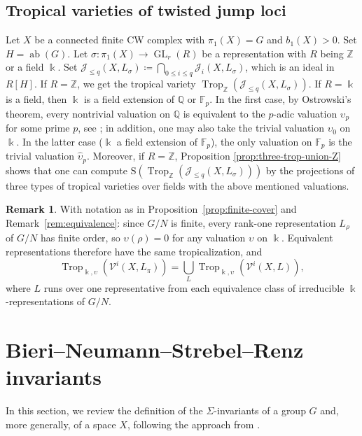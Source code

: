 \documentclass[11pt]{amsart}
\theoremstyle{definition}
\newtheorem{remark}[theorem]{Remark}
\newcommand{\Z}{\mathbb{Z}}
\newcommand{\Q}{\mathbb{Q}}
\newcommand{\F}{\mathbb{F}}
\renewcommand{\k}{\Bbbk}
\newcommand{\VV}{\mathcal{V}}
\newcommand{\cJ}{\mathcal{J}}
\newcommand{\rS}{\mathrm{S}}
\DeclareMathOperator{\ab}{{ab}}
\DeclareMathOperator{\GL}{GL}
\DeclareMathOperator{\Trop}{Trop}
\begin{document}
\subsection{Tropical varieties of twisted jump loci}
\label{subsec:twist-jump-trop}
Let $X$ be a connected finite CW complex with $\pi_1(X)=G$ and $b_1(X)>0$.
Set $H=\ab(G)$. Let $\sigma\colon \pi_1(X)\to \GL_r(R)$ be a representation 
with $R$ being $\Z$ or a field $\k$.
Set $\cJ_{\leq q}(X,L_\sigma)\coloneqq \bigcap_{0\leq i \leq q} \cJ_{ i}(X,L_\sigma)$, 
which is an ideal in $R[H]$. If $R=\Z$, we get the 
tropical variety $\Trop_\Z( \cJ_{\leq q}(X,L_\sigma) )$.
If $R=\k$ is a field, then $\k$ is a field extension of $\Q$ or $\F_p$.
In the first case, by Ostrowski's theorem, every nontrivial valuation 
on $\Q$ is equivalent to the $p$-adic valuation $\upsilon_p$ for some 
prime $p$, see \cite[Thm.~3.1.4]{Go}; in addition, one may also take 
the trivial valuation $\upsilon_0$ on $\k$.
In the latter case ($\k$ a field extension of $\F_p$), 
the only valuation on $\F_p$ is the trivial valuation $\hat{\upsilon}_p$.
Moreover, if $R=\Z$, Proposition \ref{prop:three-trop-union-Z} shows 
that one can compute $\rS(\Trop_\Z( \cJ_{\leq q}(X,L_\sigma) ))$ by the 
projections of three types of tropical varieties over fields with the above 
mentioned valuations.

\begin{remark}
\label{rem:tropical-twisted-cvs}
With notation as in Proposition~\ref{prop:finite-cover} and 
Remark~\ref{rem:equivalence}: since $G/N$ is finite, every 
rank-one representation $L_\rho$ of $G/N$ has finite order, so 
$\upsilon(\rho)=0$ for any valuation $\upsilon$ on $\k$. 
Equivalent representations therefore have the same tropicalization, 
and
\[
\Trop_{\k,\upsilon}(\VV^i(X,L_\pi))=\bigcup_L \Trop_{\k,\upsilon}(\VV^i(X,L)),
\]
where $L$ runs over one representative from each equivalence class 
of irreducible $\k$-representations of $G/N$.
\end{remark}

\section{Bieri--Neumann--Strebel--Renz invariants}
\label{sec:bnsr}

In this section, we review the definition of the $\Sigma$-invariants 
of a group $G$ and, more generally, of a space $X$, following 
the approach from \cite{Bi07, FGS, PS-plms, Su-pisa, Su-mathann}.
\end{document}
